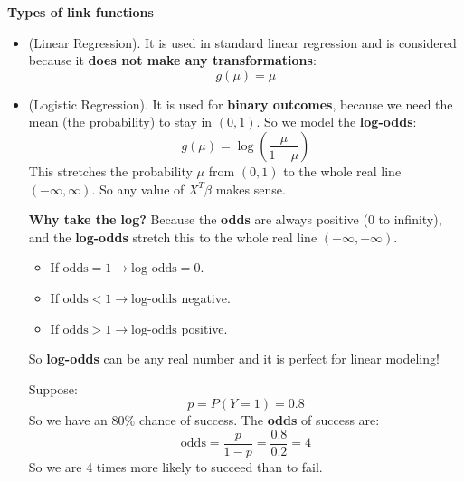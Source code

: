 \highspace
\begin{flushleft}
    \textcolor{Green3}{ \textbf{Types of link functions}}
\end{flushleft}
\begin{itemize}
    \item {} (Linear Regression). It is used in standard linear regression and is considered \naive because it \textbf{does not make any transformations}:
    \begin{equation}
        g(\mu) = \mu
    \end{equation}


    \item {} (Logistic Regression). It is used for \textbf{binary outcomes}, because we need the mean (the probability) to stay in $(0, 1)$. So we model the \textbf{log-odds}:
    \begin{equation}
        g(\mu) = \log \left( \dfrac{\mu}{1-\mu} \right)
    \end{equation}
    This stretches the probability $\mu$ from $(0,1)$ to the whole real line $(-\infty, \infty)$. So any value of $X^T \beta$ makes sense.

    \textcolor{Green3}{ \textbf{Why take the log?}} Because the \textbf{odds} are always positive (0 to infinity), and the \textbf{log-odds} stretch this to the whole real line $\left(-\infty, +\infty\right)$.
    \begin{itemize}
        \item If $\text{odds} = 1 \rightarrow \text{log-odds} = 0$.
        \item If $\text{odds} < 1 \rightarrow \text{log-odds}$ negative.
        \item If $\text{odds} > 1 \rightarrow \text{log-odds}$ positive.
    \end{itemize}
    So \textbf{log-odds} can be any real number and it is perfect for linear modeling!

    \begin{remarkbox}
        Suppose:
        \begin{equation*}
            p = P(Y = 1) = 0.8    
        \end{equation*}
        So we have an 80\% chance of success. The \textbf{odds} of success are:
        \begin{equation*}
            \text{odds} = \dfrac{p}{1 - p} = \dfrac{0.8}{0.2} = 4
        \end{equation*}
        So we are 4 times more likely to succeed than to fail.


\end{remarkbox}
\end{itemize}
